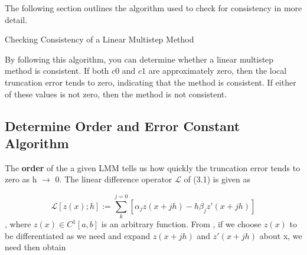 The following section outlines the algorithm used to check for consistency in more detail.


\begin{algorithm}
   \caption{Checking Consistency of a Linear Multistep Method}
   \begin{algorithmic}[1] %
       
   
   
   
   
   \end{algorithmic}
   \end{algorithm}


By following this algorithm, you can determine whether a linear multistep method is consistent. If both $c0$ and $c1$ are approximately zero, then the local truncation error tends to zero, indicating that the method is consistent. If either of these values is not zero, then the method is not consistent.

\subsection{Determine Order and Error Constant Algorithm}

The \textbf{order} of the a given LMM tells us how quickly the truncation error tends to zero as h $\to$ 0. The linear difference operator $\mathcal{L}$ of (3.1) is given as

\begin{equation}
   \mathcal{L}[z(x);h] := \sum_{k}^{j=0}[\alpha_jz(x+jh)-h\beta_jz'(x+jh)]
\end{equation}, where $z(x) \in C^1[a,b]$ is an arbitrary function. From \cite{lambert1977}, if we choose $z(x)$ to be differentiated as we need and expand $z(x+jh)$ and $z'(x+jh)$ about x, we need then obtain 

